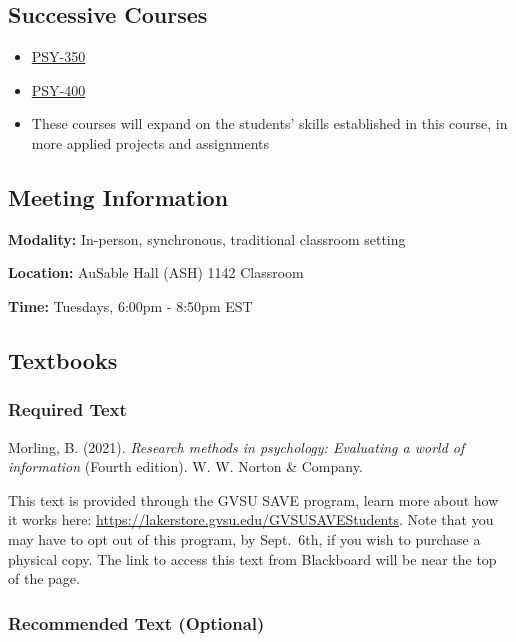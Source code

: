 \documentclass[
  12pt,
  letterpaper,
]{scrartcl}
\providecommand{\tightlist}{%
  \setlength{\itemsep}{0pt}\setlength{\parskip}{0pt}}\usepackage{longtable,booktabs,array}
\begin{document}
\subsection{Successive Courses}\label{successive-courses}

\begin{itemize}
\tightlist
\item
  \href{https://www.gvsu.edu/catalog/course/psy-350.htm}{PSY-350}
\item
  \href{https://www.gvsu.edu/catalog/course/psy-400.htm}{PSY-400}
\item
  These courses will expand on the students' skills established in this
  course, in more applied projects and assignments
\end{itemize}

\subsection{Meeting Information}\label{meeting-information}

\textbf{Modality:} In-person, synchronous, traditional classroom setting

\textbf{Location:} AuSable Hall (ASH) 1142 Classroom

\textbf{Time:} Tuesdays, 6:00pm - 8:50pm EST

\subsection{Textbooks}\label{textbooks}

\subsubsection{Required Text}\label{required-text}

Morling, B. (2021). \emph{Research methods in psychology: Evaluating a
world of information} (Fourth edition). W. W. Norton \& Company.

This text is provided through the GVSU SAVE program, learn more about
how it works here: \url{https://lakerstore.gvsu.edu/GVSUSAVEStudents}.
Note that you may have to opt out of this program, by Sept.~6th, if you
wish to purchase a physical copy. The link to access this text from
Blackboard will be near the top of the page.

\subsubsection{Recommended Text
(Optional)}\label{recommended-text-optional}
\end{document}

